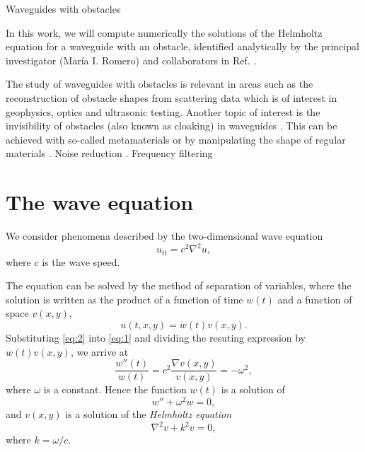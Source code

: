 \documentclass[11pt]{article}
\begin{document}
\begin{center}
{\Large Waveguides with obstacles}
\end{center}
In this work, we will compute numerically the solutions of the Helmholtz equation for a waveguide with an obstacle, identified analytically by the principal investigator (Mar\'ia I. Romero) and collaborators in Ref. \cite{zhevandrov2025discrete}.

The study of waveguides with obstacles is relevant in areas such as the reconstruction of obstacle shapes from scattering data \cite{gao2023bayesian} which is of interest in geophysics, optics and ultrasonic testing. Another topic of interest is the invisibility of obstacles (also known as cloaking) in waveguides \cite{chesnel2022acoustic,bera2021continuation,chesnel2018nonreflection}. This can be achieved with so-called metamaterials \cite{craster2024acoustic} or by manipulating the shape of regular materials \cite{chesnel2025tutorial}. Noise reduction \cite{cavalieri2019threedimensional,tajsham2025optimized}. Frequency filtering \cite{faiz2020experimental,jo2025electroelastically,wang2024enlargement}

\section{The wave equation}
We consider phenomena described by the two-dimensional wave equation
\begin{equation}
  \label{eq:1}
  u_{tt}  = c^2\nabla^2u,
\end{equation}
where $c$ is the wave speed.

The equation can be solved by the method of separation of variables, where the solution is written as the product of a function of time $w(t)$ and a function of space $v(x,y)$,
\begin{equation}
  \label{eq:2}
  u(t,x,y) = w(t)v(x,y).
\end{equation}
Substituting \eqref{eq:2} into \eqref{eq:1} and dividing the resuting expression by $w(t)v(x,y)$, we arrive at
\begin{equation}
  \label{eq:3}
  \frac{w''(t)}{w(t)} = c^2\frac{\nabla v(x,y)}{v(x,y)} = -\omega^2,
\end{equation}
where $\omega$ is a constant. Hence the function $w(t)$ is a solution of
\begin{equation}
  \label{eq:4}
  w'' + \omega^2 w = 0,
\end{equation}
and $v(x,y)$ is a solution of the {\it Helmholtz equation}
\begin{equation}
  \label{eq:5}
  \nabla^2 v + k^2 v = 0,
\end{equation}
where $k = \omega/c$.
\end{document}
